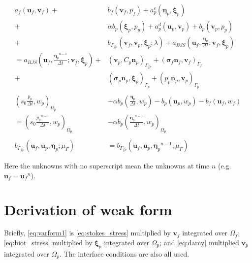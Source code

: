 \documentclass{article}
\newcommand{\mathspace}[1]{\ensuremath{#1}\xspace} %
\newcommand{\sigmabf}{\mathspace{\boldsymbol{\sigma}}}
\newcommand{\inner}[2]{\mathspace{\left (#1, #2 \right)}}
\newcommand{\dt}{\mathspace{\Delta t}}
\newcommand{\stokes}{\mathspace{\Omega_{f}}}
\newcommand{\stokesbdy}{\mathspace{\Gamma_{f}}}
\newcommand{\darcy}{\mathspace{\Omega_{p}}}
\newcommand{\darcybdy}{\mathspace{\Gamma_{p}}}
\newcommand{\interface}{\mathspace{\Gamma_{fp}}}
\newcommand{\nf}{\mathspace{\mathbf{n}_f}}
\newcommand{\np}{\mathspace{\mathbf{n}_p}}
\newcommand{\uf}{\mathspace{\mathbf{u}_f}}
\newcommand{\vf}{\mathspace{\mathbf{v}_f}}
\newcommand{\up}{\mathspace{\mathbf{u}_p}}
\newcommand{\vp}{\mathspace{\mathbf{v}_p}}
\newcommand{\pf}{\mathspace{p_f}}
\newcommand{\pp}{\mathspace{p_p}}
\newcommand{\wf}{\mathspace{w_f}}
\renewcommand{\wp}{\mathspace{w_p}}
\newcommand{\disp}{\mathspace{\boldsymbol{\eta}_p}}
\newcommand{\disptest}{\mathspace{\boldsymbol{\xi}_p}}
\newcommand{\mult}{\mathspace{\lambda_{\Gamma}}}
\newcommand{\multtest}{\mathspace{\mu_{\Gamma}}}
\begin{document}
\begin{subequations}
  \begin{align}
    a_f(\uf, \vf) +& b_f(\vf, \pf)  + a^e_p(\disp, \disptest) \label{eq:varform1} \\
    +&\alpha b_p(\disptest, \pp)  + a_p^d(\up, \vp) + b_p(\vp, \pp)  \nonumber \\
    + &b_{\interface}\left (\vf, \vp, \disptest; \lambda \right ) + a_{BJS}\left (\uf, \frac{\disp} {\dt}; \vf, \disptest \right)\nonumber \\
                   = a_{BJS}\left (\uf, \frac{\disp^{n-1}} {\dt}; \vf, \disptest \right) + & \inner{\vp}{C_p\np}_{\interface} + (\sigmabf_f\nf, \vf)_{\stokesbdy} \nonumber \\
                   + & (\sigmabf_p\np, \disptest)_{\darcybdy} + (\pp\np, \vp)_{\darcybdy}\nonumber \\ \nonumber \\
    \inner{s_0 \frac {\pp} {\dt}}{\wp}_{\darcy}  &- \alpha b_p\left ( \frac{\disp} {\dt}, \wp \right ) - b_p(\up, \wp) - b_f(\uf, \wf) \label{eq:varform2}
    \\ = \inner{s_0 \frac {\pp^{n-1}} {\dt}}{\wp}_{\darcy} &- \alpha b_p\left ( \frac {\disp^{n-1}} {\dt}, \wp \right )_{\darcy}\nonumber \\ \nonumber \\
    b_{\interface}\left (\uf, \up, \disp; \multtest \right ) &= b_{\interface}\left (\uf, \up, \disp^{n-1}; \multtest \right ) \label{eq:varform3}
  \end{align}
\end{subequations}

Here the unknowns with no superscript mean the unknowns at time $n$ (e.g. $\uf = \uf^n$). 



\section{Derivation of weak form}
Briefly, \eqref{eq:varform1} is \eqref{eq:stokes_stress} multiplied by \vf integrated over \stokes; \eqref{eq:biot_stress} multiplied by \disptest integrated over \darcy; and \eqref{eq:darcy} multiplied \vp integrated over \darcy. The interface conditions are also all used.
\end{document}
